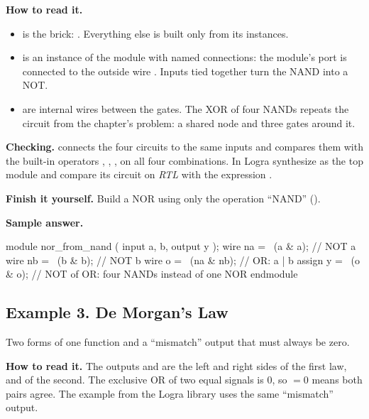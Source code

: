 \textbf{How to read it.}
\begin{itemize}
  \item {} is the brick: . Everything else is built only from its instances.
  \item {} is an instance of the module with named connections: the module's port  is connected to the outside wire . Inputs tied together turn the NAND into a NOT.
  \item {} are internal wires between the gates. The XOR of four NANDs repeats the circuit from the chapter's problem: a shared node  and three gates around it.
\end{itemize}
\textbf{Checking.}  connects the four circuits to the
same inputs and compares them with the built-in operators \code{\textasciitilde},
\code{\&}, \code{|}, \code{\^{}} on all four combinations. In Logra synthesize
 as the top module and compare its circuit on \emph{RTL}
with the expression .

\textbf{Finish it yourself.} Build a NOR using only the operation ``NAND''
().

\textbf{Sample answer.}\par\nopagebreak
\begin{vcode}
module nor_from_nand (
    input  a, b,
    output y
);
    wire na = ~(a & a);        // NOT a
    wire nb = ~(b & b);        // NOT b
    wire o  = ~(na & nb);      // OR: a | b
    assign y = ~(o & o);       // NOT of OR: four NANDs instead of one NOR
endmodule
\end{vcode}

\subsection{Example 3. De Morgan's Law}

Two forms of one function and a ``mismatch'' output that must always be zero.


\textbf{How to read it.} The outputs  and  are the left and
right sides of the first law,  and  of the second. The
exclusive OR of two equal signals is 0, so  $=0$ means both
pairs agree. The  example from the Logra library uses the same
``mismatch'' output.

